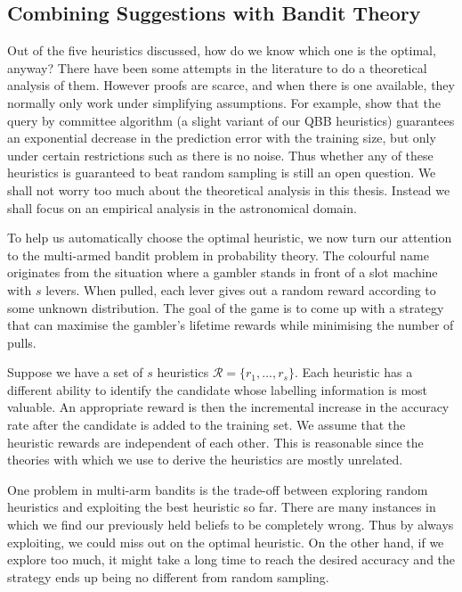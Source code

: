 \documentclass[fleqn,10pt,lineno]{wlpeerj} %
\newcommand{\R}{\mathcal{R}}
\begin{document}
\subsection*{Combining Suggestions with Bandit Theory}

Out of the five heuristics discussed, how do we know which one is the optimal,
anyway? There have been some attempts in the literature to do a theoretical
analysis of them. However proofs are scarce, and when there is one available,
they normally only work under simplifying assumptions. For example,
\cite{freund97} show that the query by committee algorithm (a slight variant of
our QBB heuristics) guarantees an exponential decrease in the prediction error
with the training size, but only under certain restrictions such as there is no
noise. Thus whether any of these heuristics is guaranteed to beat random
sampling is still an open question. We shall not worry too much about the
theoretical analysis in this thesis. Instead we shall focus on an empirical
analysis in the astronomical domain.

To help us automatically choose the optimal heuristic, we now turn our
attention to the multi-armed bandit problem in probability theory. The
colourful name originates from the situation where a gambler stands in front of
a slot machine with $s$ levers. When pulled, each lever gives out a random
reward according to some unknown distribution. The goal of the game is to come
up with a strategy that can maximise the gambler's lifetime rewards while
minimising the number of pulls.

Suppose we have a set of $s$ heuristics $ \R = \{r_1, ..., r_s \}$. Each
heuristic has a different ability to identify the candidate whose labelling
information is most valuable. An appropriate reward is then the incremental
increase in the accuracy rate after the candidate is added to the training set.
We assume that the heuristic rewards are independent of each other. This is
reasonable since the theories with which we use to derive the heuristics are
mostly unrelated.

One problem in multi-arm bandits is the trade-off between exploring random
heuristics and exploiting the best heuristic so far. There are many instances
in which we find our previously held beliefs to be completely wrong. Thus by
always exploiting, we could miss out on the optimal heuristic. On the other
hand, if we explore too much, it might take a long time to reach the desired
accuracy and the strategy ends up being no different from random sampling.
\end{document}
